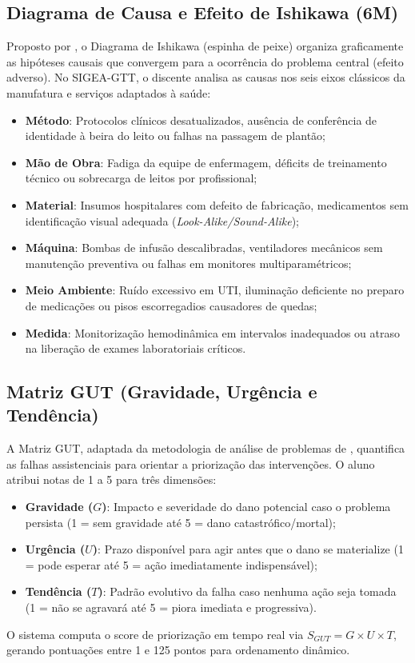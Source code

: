 \subsection{Diagrama de Causa e Efeito de Ishikawa (6M)}
Proposto por , o Diagrama de Ishikawa (espinha de peixe) organiza graficamente as hipóteses causais que convergem para a ocorrência do problema central (efeito adverso). No SIGEA-GTT, o discente analisa as causas nos seis eixos clássicos da manufatura e serviços adaptados à saúde:
\begin{itemize}
    \item \textbf{Método}: Protocolos clínicos desatualizados, ausência de conferência de identidade à beira do leito ou falhas na passagem de plantão;
    \item \textbf{Mão de Obra}: Fadiga da equipe de enfermagem, déficits de treinamento técnico ou sobrecarga de leitos por profissional;
    \item \textbf{Material}: Insumos hospitalares com defeito de fabricação, medicamentos sem identificação visual adequada (\textit{Look-Alike/Sound-Alike});
    \item \textbf{Máquina}: Bombas de infusão descalibradas, ventiladores mecânicos sem manutenção preventiva ou falhas em monitores multiparamétricos;
    \item \textbf{Meio Ambiente}: Ruído excessivo em UTI, iluminação deficiente no preparo de medicações ou pisos escorregadios causadores de quedas;
    \item \textbf{Medida}: Monitorização hemodinâmica em intervalos inadequados ou atraso na liberação de exames laboratoriais críticos.
\end{itemize}

\subsection{Matriz GUT (Gravidade, Urgência e Tendência)}
A Matriz GUT, adaptada da metodologia de análise de problemas de , quantifica as falhas assistenciais para orientar a priorização das intervenções. O aluno atribui notas de 1 a 5 para três dimensões:
\begin{itemize}
    \item \textbf{Gravidade ($G$)}: Impacto e severidade do dano potencial caso o problema persista (1 = sem gravidade até 5 = dano catastrófico/mortal);
    \item \textbf{Urgência ($U$)}: Prazo disponível para agir antes que o dano se materialize (1 = pode esperar até 5 = ação imediatamente indispensável);
    \item \textbf{Tendência ($T$)}: Padrão evolutivo da falha caso nenhuma ação seja tomada (1 = não se agravará até 5 = piora imediata e progressiva).
\end{itemize}
O sistema computa o score de priorização em tempo real via $S_{GUT} = G \times U \times T$, gerando pontuações entre 1 e 125 pontos para ordenamento dinâmico.

